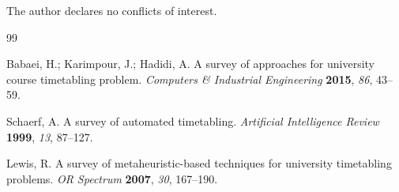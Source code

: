 \documentclass[12pt,a4paper]{article}
\begin{document}
The author declares no conflicts of interest.

\begin{thebibliography}{99}

Babaei, H.; Karimpour, J.; Hadidi, A. A survey of approaches for university course timetabling problem. \textit{Computers \& Industrial Engineering} \textbf{2015}, \textit{86}, 43--59.

Schaerf, A. A survey of automated timetabling. \textit{Artificial Intelligence Review} \textbf{1999}, \textit{13}, 87--127.

Lewis, R. A survey of metaheuristic-based techniques for university timetabling problems. \textit{OR Spectrum} \textbf{2007}, \textit{30}, 167--190.

\end{thebibliography}
\end{document}
